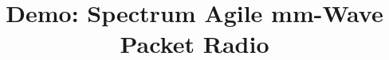 \documentclass{acm_proc_article-sp}
\begin{document}
\title{Demo: Spectrum Agile mm-Wave Packet Radio}
%
%
%
%
%
\end{document}
